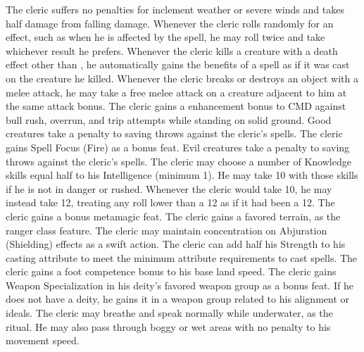 The cleric suffers no penalties for inclement weather or severe winds and takes half damage from falling damage.
 Whenever the cleric rolls randomly for an effect, such as when he is affected by the  spell, he may roll twice and take whichever result he prefers.
 Whenever the cleric kills a creature with a death effect other than , he automatically gains the benefits of a  spell as if it was cast on the creature he killed.
 Whenever the cleric breaks or destroys an object with a melee attack, he may take a free melee attack on a creature adjacent to him at the same attack bonus.
 The cleric gains a  enhancement bonus to CMD against bull rush, overrun, and trip attempts while standing on solid ground.
 Good creatures take a  penalty to saving throws against the cleric's spells.
 The cleric gains Spell Focus (Fire) as a bonus feat.
 Evil creatures take a  penalty to saving throws against the cleric's spells.
 The cleric may choose a number of Knowledge skills equal half to his Intelligence (minimum 1). He may take 10 with those skills if he is not in danger or rushed.
 Whenever the cleric would take 10, he may instead take 12, treating any roll lower than a 12 as if it had been a 12.
 The cleric gains a bonus metamagic feat.
 The cleric gains a favored terrain, as the ranger class feature.
 The cleric may maintain concentration on Abjuration (Shielding) effects as a swift action.
 The cleric can add half his Strength to his casting attribute to meet the minimum attribute requirements to cast spells.
 The cleric gains a  foot competence bonus to his base land speed.
 The cleric gains Weapon Specialization in his deity's favored weapon group as a bonus feat. If he does not have a deity, he gains it in a weapon group related to his alignment or ideals.
 The cleric may breathe and speak normally while underwater, as the  ritual. He may also pass through boggy or wet areas with no penalty to his movement speed.

